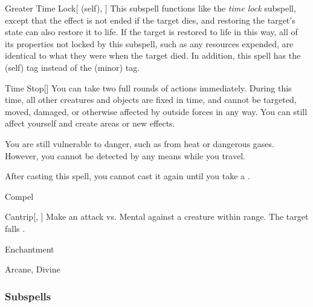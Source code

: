 \begin{ability}[\nth{7}]{Greater Time Lock}[ (self), ]
This subspell functions like the \textit{time lock} subspell, except that the effect is not ended if the target dies, and restoring the target's state can also restore it to life.
If the target is restored to life in this way, all of its properties not locked by this subspell, such as any resources expended, are identical to what they were when the target died.
In addition, this spell has the  (self) tag instead of the  (minor) tag.
\end{ability}
\vspace{0.25em}


\begin{ability}[\nth{7}]{Time Stop}[]
You can take two full rounds of actions immediately.
During this time, all other creatures and objects are fixed in time, and cannot be targeted, moved, damaged, or otherwise affected by outside forces in any way.
You can still affect yourself and create areas or new effects.

You are still vulnerable to danger, such as from heat or dangerous gases.
However, you cannot be detected by any means while you travel.

After casting this spell, you cannot cast it again until you take a .
\end{ability}
\vspace{0.25em}

\newpage
\begin{spellsection}{Compel}

\begin{spellheader}
\end{spellheader}


\begin{ability}{Cantrip}[, ]
Make an attack vs. Mental against a creature within \rngmed range.
\hit The target falls .
\end{ability}




 Enchantment

 Arcane, Divine
\end{spellsection}


\subsubsection{Subspells}


